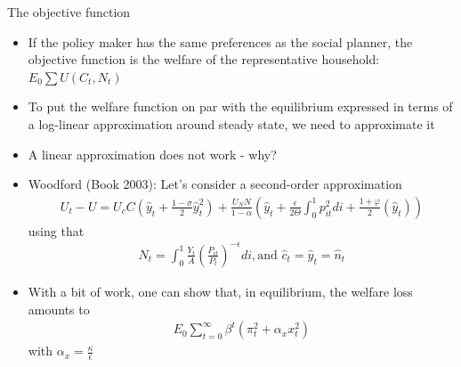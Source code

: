 \documentclass[9pt,xcolor={dvipsnames}]{beamer}
\newcommand{\bit}{\begin{itemize}}
\newcommand{\eit}{\end{itemize}}
\begin{document}
\begin{frame}{The objective function}

\bit
\setlength\itemsep{1em}
\item If the policy maker has the same preferences as the social planner, the objective function is the welfare of the representative household: $E_0 \sum U (C_t, N_t)$

\item To put the welfare function on par with the equilibrium expressed in terms of a log-linear approximation around steady state, we need to approximate it

\item A linear approximation does not work - why?

\item Woodford (Book 2003): Let's consider a second-order approximation
\begin{eqnarray}
U_t-U = U_c C \left(\hat y_t + \frac{1-\sigma}{2} \hat y_t^2 \right) + \frac{U_N N}{1-\alpha} \left(\hat y_t + \frac{\epsilon}{2 \Theta} \int_{0}^{1} p_{it}^2 di  + \frac{1+\varphi}{2} (\hat y_t)\right) \nonumber
\end{eqnarray}
using that
\begin{eqnarray}
N_t = \int_{0}^{1} \frac{Y_{t}}{A}\left(\frac{P_{it}}{P_t} \right)^{-\epsilon} di, \text{and  } \hat c_t = \hat y_t = \hat n_t \nonumber
\end{eqnarray}

\item With a bit of work, one can show that, in equilibrium, the welfare loss amounts to
\begin{eqnarray}
E_0 \sum_{t=0}^{\infty} \beta^t (\pi_t^2 + \alpha_x x_t^2) \nonumber
\end{eqnarray}
with $\alpha_x = \frac{\kappa}{\epsilon}$

\eit

\end{frame}
\end{document}
